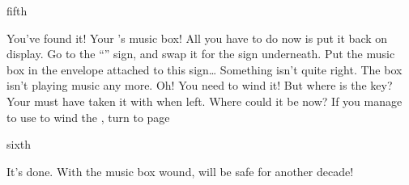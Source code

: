 \documentclass[greennotebook]{NeptuneBall}
\begin{document}
\begin{page}{fifth}

You've found it! Your \cAthena{\parent}'s music box! All you have to do now is put it back on display. Go to the ``\sArtifactZero{}'' sign, and swap it for the sign underneath. Put the music box in the envelope attached to this sign\ldots{} Something isn't quite right. The box isn't playing music any more. Oh! You need to wind it! But where is the key? Your \cAthena{\parent} must have taken it with \cAthena{\them} when \cAthena{\they} left. Where could it be now? If you manage to use \iMusicBoxKey{} to wind the \iMusicBox{}, turn to page 

\end{page}

\begin{page}{sixth}

It's done. With the music box wound, \pAtlantis{} will be safe for another decade!

\end{page}

\endnotebook
\end{document}
